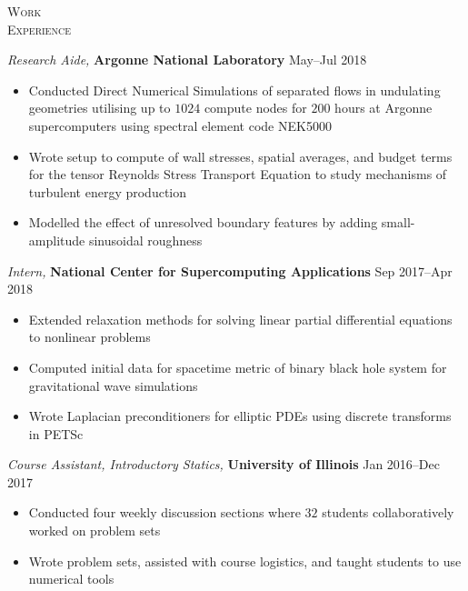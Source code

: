 \documentclass[10pt]{article}
\begin{document}
\begin{multicols}{2}
\textsc{\small Work \\ Experience}
\columnbreak

{\sl Research Aide,} \textbf{Argonne National Laboratory} \hfill May--Jul 2018

\vspace{-1.75em}
\begin{itemize}[label=-]
    \setlength\itemsep{-0.25em}
    \item Conducted Direct Numerical Simulations of separated flows in undulating geometries utilising up to $1024$ compute nodes for $200$ hours at Argonne supercomputers using spectral element code NEK5000
    \item Wrote setup to compute of wall stresses, spatial averages, and budget terms for the tensor Reynolds Stress Transport Equation to study mechanisms of turbulent energy production
    \item Modelled the effect of unresolved boundary features by adding small-amplitude sinusoidal roughness
\end{itemize}
\vspace{-2.0em}

\vspace{0.5em}
%
{\sl Intern,} \textbf{National Center for Supercomputing Applications} \hfill Sep 2017--Apr 2018

\vspace{-1.75em}
\begin{itemize}[label=-]
    \setlength\itemsep{-0.25em}
    \item Extended relaxation methods for solving linear partial differential equations to nonlinear problems
    \item Computed initial data for spacetime metric of binary black hole system for gravitational wave simulations
    \item Wrote Laplacian preconditioners for elliptic PDEs using discrete transforms in PETSc
\end{itemize}
\vspace{-2.0em}

\vspace{0.5em}
%
{\sl Course Assistant, Introductory Statics,} \textbf{University of Illinois} \hfill Jan 2016--Dec 2017

\vspace{-1.75em}
\begin{itemize}[label=-]
    \setlength\itemsep{-0.25em}
    \item Conducted four weekly discussion sections where $32$ students collaboratively worked on problem sets
    \item Wrote problem sets, assisted with course logistics, and taught students to use numerical tools
\end{itemize}
\vspace{-2.0em}

\end{multicols}
\end{document}
